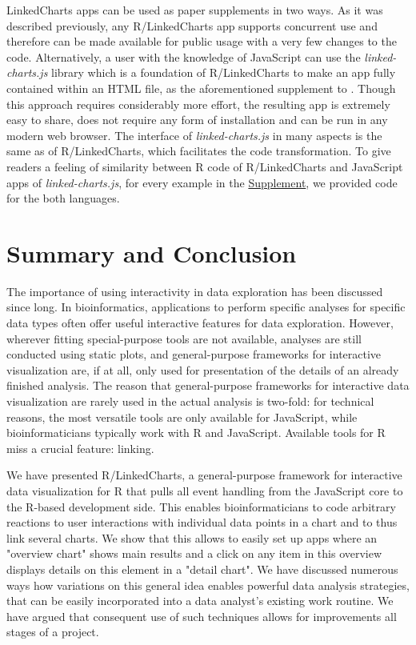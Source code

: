 \documentclass[twocolumn,10pt]{article}
\newcommand{\Supplement}{\href{https://anders-biostat.github.io/lc-paper/}{Supplement}}
\begin{document}
LinkedCharts apps can be used as paper supplements in two ways. As it was described previously, any R/LinkedCharts app supports concurrent use and therefore can be made available for public usage with a very few changes to the code. Alternatively, a user with the knowledge of JavaScript can use the \emph{linked-charts.js} library which is a foundation of R/LinkedCharts to make an app fully contained within an HTML file, as the aforementioned supplement to \citet{wang_2020}. Though this approach requires considerably more effort, the resulting app is extremely easy to share, does not require any form of installation and can be run in any modern web browser. The interface of \emph{linked-charts.js} in many aspects is the same as of R/LinkedCharts, which facilitates the code transformation. To give readers a feeling of similarity between R code of R/LinkedCharts and JavaScript apps of \emph{linked-charts.js}, for every example in the \Supplement, we provided code for the both languages.

\section{Summary and Conclusion}

The importance of using interactivity in data exploration has been discussed since long. In bioinformatics, applications to perform specific analyses for specific data types often offer useful interactive features for data exploration. However, wherever fitting special-purpose tools are not available, analyses are still conducted using static plots, and general-purpose frameworks for interactive visualization are, if at all, only used for presentation of the details of an already finished analysis. The reason that general-purpose frameworks for interactive data visualization are rarely used in the actual analysis is two-fold: for technical reasons, the most versatile tools are only available for JavaScript, while bioinformaticians typically work with R and JavaScript. Available tools for R miss a crucial feature: linking.

We have presented R/LinkedCharts, a general-purpose framework for interactive data visualization for R that pulls all event handling from the JavaScript core to the R-based development side. This enables bioinformaticians to code arbitrary reactions to user interactions with individual data points in a chart and to thus link several charts. We show that this allows to easily set up apps where an "overview chart" shows main results and a click on any item in this overview displays details on this element in a "detail chart". We have discussed numerous ways how variations on this general idea enables powerful data analysis strategies, that can be easily incorporated into a data analyst's existing work routine. We have argued that consequent use of such techniques allows for improvements all stages of a project.
\end{document}
